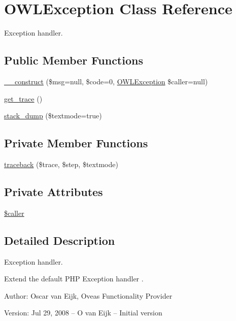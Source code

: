 \hypertarget{classOWLException}{
\section{OWLException Class Reference}
\label{classOWLException}
}
Exception handler.  


\subsection*{Public Member Functions}
\begin{CompactItemize}
\item 
\hyperlink{classOWLException_02821b324b42b7818c3fefe7638444e7}{\_\-\_\-construct} (\$msg=null, \$code=0, \hyperlink{classOWLException}{OWLException} \$caller=null)
\item 
\hyperlink{classOWLException_bec096884c369f08040443561ac3b164}{get\_\-trace} ()
\item 
\hyperlink{classOWLException_cf2b94859fdebcefc22e8a75ac1a670d}{stack\_\-dump} (\$textmode=true)
\end{CompactItemize}
\subsection*{Private Member Functions}
\begin{CompactItemize}
\item 
\hyperlink{classOWLException_6e857cc079ee29428791e4926fe1677a}{traceback} (\$trace, \$step, \$textmode)
\end{CompactItemize}
\subsection*{Private Attributes}
\begin{CompactItemize}
\item 
\hyperlink{classOWLException_f59d0890c1de1187f43084ec617545f1}{\$caller}
\end{CompactItemize}


\subsection{Detailed Description}
Exception handler. 

Extend the default PHP Exception handler . \begin{Desc}
\item[Author:]Oscar van Eijk, Oveas Functionality Provider \end{Desc}
\begin{Desc}
\item[Version:]Jul 29, 2008 -- O van Eijk -- Initial version \end{Desc}



